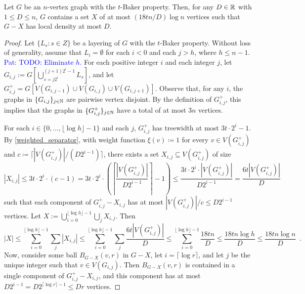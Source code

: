 \documentclass{patmorin}
\renewcommand{\le}{\leqslant}
\newcommand{\david}[1]{{\color{orange} David: #1}}
\newcommand{\pat}[1]{\textcolor{Blue}{Pat: #1}}
\begin{document}







\begin{lem}\label{sparsifier_baker}
  Let $G$ be an $n$-vertex graph with the $t$-Baker property.  Then, for any $D\in\mathbb{R}$ with $1\le D\le n$, $G$ contains a set $X$ of at most $(18tn/D)\log n$ vertices such that $G-X$ has local density at most $D$.
\end{lem}

\begin{proof}
  Let $\{L_s:s\in Z\}$ be a layering of $G$ with the $t$-Baker property.  Without loss of generality, assume that $L_i=\emptyset$ for each $i <0$ and each $j>h$, where $h\le n-1$. \pat{TODO: Eliminate $h$.}  For each positive integer $i$ and each integer $j$, let $G_{i,j}:=G[\bigcup_{s=j2^i}^{(j+1)2^i-1} L_s]$,  and let $G^+_{i,j}=G[V(G_{i,j-1})\cup V(G_{i,j})\cup V(G_{i,j+1})]$.  Observe that, for any $i$, the graphs in $\{ G_{i,j}\}_{j\in\mathbb{N}}$ are pairwise vertex disjoint.  By the definition of $G^+_{i,j}$, this implies that the graphs in $\{G^+_{i,j}\}_{j\in\mathbb{N}}$ have a total of at most $3n$ vertices.

  For each $i\in\{0,\ldots,\lfloor \log h\rfloor-1\}$ and each $j$, $G^+_{i,j}$ has treewidth at most $3t\cdot 2^i-1$.  By \cref{weighted_separator}, with weight function $\xi(v)\coloneqq 1$ for every $v\in V(G^+_{i,j})$ and $c \coloneqq \lceil |V(G^+_{i,j})|/(D2^{i-1})\rceil$, there exists a set $X_{i,j}\subseteq V(G^+_{i,j})$ of size
  \[
    |X_{i,j}|\le 3t\cdot 2^i\cdot(c-1) =
    3t\cdot 2^i\cdot\left(\left\lceil\frac{ |V(G^+_{i,j})|}{D2^{i-1}}\right\rceil-1\right) \le
    \frac{3t\cdot 2^i\cdot|V(G^+_{i,j})|}{ D2^{i-1}}
    = \frac{6t|V(G^+_{i,j})|}{D}
  \]
  such that each component of $G^+_{i,j}-X_{i,j}$ has at most $|V(G^+_{i,j})|/c \le D2^{i-1}$ vertices.  Let $X:=\bigcup_{i=0}^{\lfloor\log h\rfloor-1}\bigcup_{j}X_{i,j}$.  Then
  \[
    |X| \le
    \sum_{i=0}^{\lfloor\log h\rfloor-1}\sum_{j} |X_{i,j}|
    \le
    \sum_{i=0}^{\lfloor\log h\rfloor-1}\sum_{j} \frac{6t|V(G^+_{i,j})|}{D}
    \le
    \sum_{i=0}^{\lfloor\log h\rfloor-1}\frac{18tn}{D}
    \le \frac{18tn\log h}{D}\le\frac{18tn\log n}{D}
    \enspace .
  \]
  Now, consider some ball $B_{G-X}(v,r)$ in $G-X$, let $i=\lceil\log r\rceil$, and let $j$ be the unique integer such that $v\in V(G_{i,j})$.  Then $B_{G-X}(v,r)$ is contained in a single component of $G^+_{i,j}-X_{i,j}$, and this component has at most $D2^{i-1}=D2^{\lceil\log r\rceil-1}\le Dr$ vertices.
\end{proof}
\end{document}
